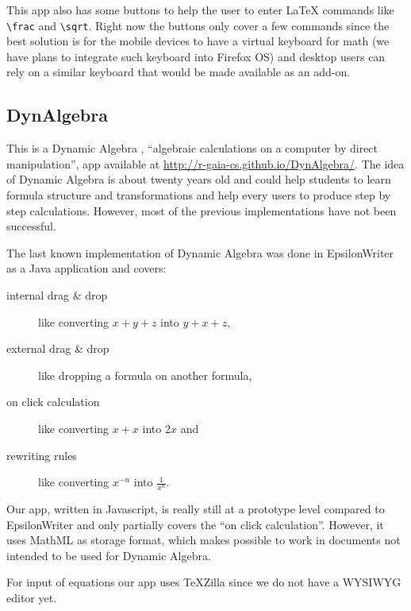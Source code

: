 This app also has some buttons to help the user to enter LaTeX commands like
{\tt \textbackslash frac} and {\tt \textbackslash sqrt}. Right now the buttons
only cover a few commands since the best solution is for the mobile devices
to have a virtual keyboard for math (we have plans to integrate
such keyboard into Firefox OS) and desktop users can rely on a similar keyboard
that would be made available as an add-on.

\subsection{DynAlgebra}

This is a Dynamic Algebra \cite{Nicaud1}, ``algebraic calculations
on a computer by direct manipulation'', app available at
\href{http://r-gaia-cs.github.io/DynAlgebra/}{http://r-gaia-cs.github.io/DynAlgebra/}.
The idea of Dynamic Algebra is about twenty years old and could help
students to learn formula structure and transformations and help every users to
produce step by step calculations. However, most of the previous implementations
have not been successful.

The last known implementation of Dynamic Algebra was done in EpsilonWriter
\cite{Nicaud2} as a Java application and covers:
\begin{description}
  \item[internal drag \& drop] like converting $x + y + z$ into $y + x + z$,
  \item[external drag \& drop] like dropping a formula on another formula,
  \item[on click calculation] like converting $x + x$ into $2 x$ and
  \item[rewriting rules] like converting $x^{-n}$ into $\frac{1}{x^n}$.
\end{description}

Our app, written in Javascript, is really still at a prototype level compared
to EpsilonWriter and only partially
covers the ``on click calculation''. However, it uses MathML as storage format,
which makes possible to work in documents not intended to be used for
Dynamic Algebra.

For input of equations our app uses TeXZilla since we do not have a WYSIWYG
editor yet.
